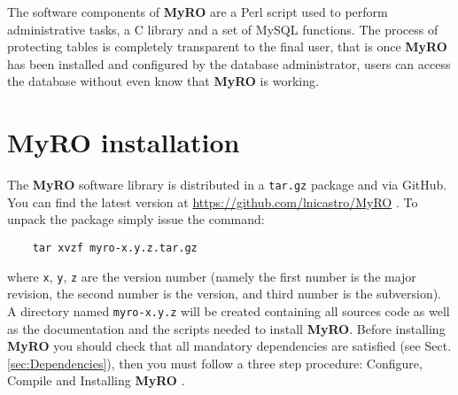 \documentclass[12pt,titlepage]{article}
\newcommand{\myro}{\textbf{MyRO} }
\newcommand{\myrO}{\textbf{MyRO}}
\def\git{ \url{https://github.com/lnicastro/MyRO} }
\begin{document}
\smallskip
The software components of \myro are a Perl script used to perform
administrative tasks, a C library and a set of MySQL functions. The
process of protecting tables is completely transparent to the final
user, that is once \myro has been installed and configured by the
database administrator, users can access the database without even
know that \myro is working.
%
%



\newpage
\section{\myro installation}

The \myro software library is distributed in a \verb|tar.gz| package
and via GitHub.
You can find the latest version at \git. To unpack the package simply
issue the command:
%
\begin{verbatim}
    tar xvzf myro-x.y.z.tar.gz
\end{verbatim}
%
where \verb|x|, \verb|y|, \verb|z| are the version number (namely the
first number is the major revision, the second number is the version,
and third number is the subversion). A directory named
\verb|myro-x.y.z| will be created containing all sources code as well
as the documentation and the scripts needed to install \myrO. Before
installing \myro you should check that all mandatory dependencies are
satisfied (see Sect. \ref{sec:Dependencies}), then you must follow a
three step procedure: Configure, Compile and Installing \myro.
\end{document}

